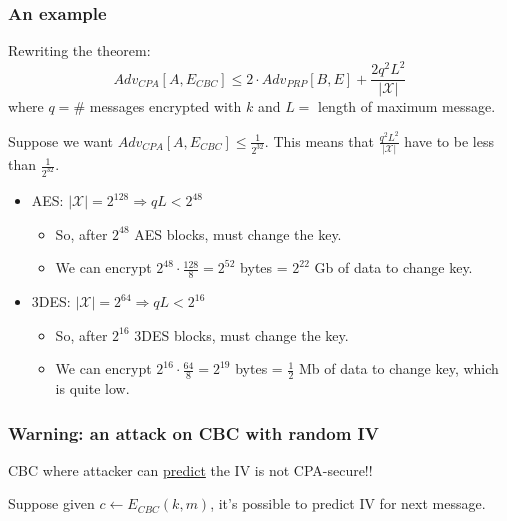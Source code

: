 \documentclass[12pt]{book}
\begin{document}
\subsubsection{An example}
Rewriting the theorem:
$$Adv_{CPA}[A,E_{CBC}]\leq 2\cdot Adv_{PRP}[B,E]+\frac{2q^{2}L^{2}}{|\mathcal{X}|}$$
where $q=\#$ messages encrypted with $k$ and $L=$ length of maximum message.

Suppose we want $Adv_{CPA}[A,E_{CBC}]\leq \frac{1}{2^{32}}$. This means that $\frac{q^{2}L^{2}}{|\mathcal{X}|}$ have to be less than $\frac{1}{2^{32}}$.
\begin{itemize}
	\item AES: $|\mathcal{X}|=2^{128}\Rightarrow qL<2^{48}$
	\begin{itemize}
		\item[] So, after $2^{48}$ AES blocks, must change the key.
		\item[] We can encrypt $2^{48}\cdot \frac{128}{8}=2^{52}$ bytes = $2^{22}$ Gb of data to change key.
	\end{itemize}
	\item 3DES: $|\mathcal{X}|=2^{64}\Rightarrow qL<2^{16}$
	\begin{itemize}
		\item[] So, after $2^{16}$ 3DES blocks, must change the key.
		\item[] We can encrypt $2^{16}\cdot \frac{64}{8}=2^{19}$ bytes = $\frac{1}{2}$ Mb of data to change key, which is quite low.
	\end{itemize}
\end{itemize}

\subsubsection{Warning: an attack on CBC with random IV}
CBC where attacker can \underline{predict} the IV is not CPA-secure!!

Suppose given $c\leftarrow E_{CBC}(k,m)$, it's possible to predict IV for next message.
\end{document}
